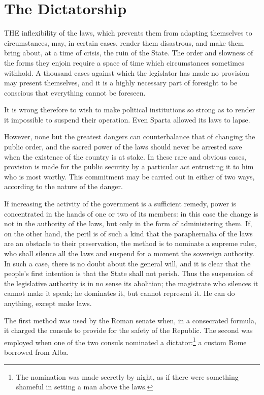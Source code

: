 \documentclass[12pt]{report}
\begin{document}
\section{The Dictatorship}
THE inflexibility of the laws, which prevents them from adapting themselves to circumstances, may, in certain cases, render them disastrous, and make them bring about, at a time of crisis, the ruin of the State. The order and slowness of the forms they enjoin require a space of time which circumstances sometimes withhold. A thousand cases against which the legislator has made no provision may present themselves, and it is a highly necessary part of foresight to be conscious that everything cannot be foreseen.

It is wrong therefore to wish to make political institutions so strong as to render it impossible to suspend their operation. Even Sparta allowed its laws to lapse.

However, none but the greatest dangers can counterbalance that of changing the public order, and the sacred power of the laws should never be arrested save when the existence of the country is at stake. In these rare and obvious cases, provision is made for the public security by a particular act entrusting it to him who is most worthy. This commitment may be carried out in either of two ways, according to the nature of the danger.

If increasing the activity of the government is a sufficient remedy, power is concentrated in the hands of one or two of its members: in this case the change is not in the authority of the laws, but only in the form of administering them. If, on the other hand, the peril is of such a kind that the paraphernalia of the laws are an obstacle to their preservation, the method is to nominate a supreme ruler, who shall silence all the laws and suspend for a moment the sovereign authority. In such a case, there is no doubt about the general will, and it is clear that the people's first intention is that the State shall not perish. Thus the suspension of the legislative authority is in no sense its abolition; the magistrate who silences it cannot make it speak; he dominates it, but cannot represent it. He can do anything, except make laws.

The first method was used by the Roman senate when, in a consecrated formula, it charged the consuls to provide for the safety of the Republic. The second was employed when one of the two consuls nominated a dictator:\footnote{The nomination was made secretly by night, as if there were something shameful in setting a man above the laws.} a custom Rome borrowed from Alba.
\end{document}
